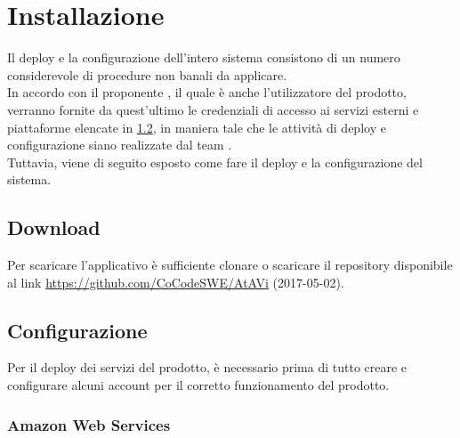 \section{Installazione}
Il deploy e la configurazione dell'intero sistema consistono di un numero considerevole di procedure non banali da applicare.\\
In accordo con il proponente \PROPONENTE, il quale è anche l'utilizzatore del prodotto, verranno fornite da quest'ultimo le credenziali di accesso ai servizi esterni e piattaforme elencate in \ref{configurazione}, in maniera tale che le attività di deploy e configurazione siano realizzate dal team \GRUPPO.\\
Tuttavia, viene di seguito esposto come fare il deploy e la configurazione del sistema.
\subsection{Download}\label{download}
Per scaricare l'applicativo è sufficiente clonare o scaricare il repository disponibile al link \url{https://github.com/CoCodeSWE/AtAVi} (2017-05-02).

\subsection{Configurazione}\label{configurazione}
Per il deploy dei servizi del prodotto, è necessario prima di tutto creare e configurare alcuni account per il corretto funzionamento del prodotto.

\subsubsection{Amazon Web Services}
